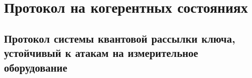 \chapter{Протокол на когерентных состояниях} \label{ch:ch5}
\section{Протокол системы квантовой рассылки ключа, устойчивый к атакам на измерительное оборудование} \label{sec:ch5/sec1}


